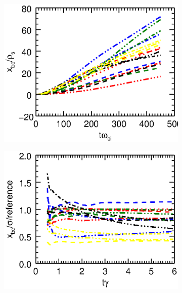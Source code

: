 \documentclass[9pt,twocolumn]{article}
\renewcommand{\=}[1]{\stackrel{#1}{=}} %
\theoremstyle{definition}
\theoremstyle{remark}
\begin{document}
\begin{figure}
\centering
\begin{subfigure}{.4\textwidth}
	\centering
	\includegraphics[trim={115mm 88mm 1mm 7mm},clip,width=1\linewidth]{Pictures/posxgrpewiitgt.eps}
\end{subfigure}
\begin{subfigure}{.4\textwidth}
	\centering
	\includegraphics[trim={115mm 88mm 1mm 7mm},clip,width=1\linewidth]{Pictures/xnormgrpewiitgt.eps}
\end{subfigure}
\begin{subfigure}{.4\textwidth}
	\centering

\end{subfigure}
\end{figure}
\end{document}
